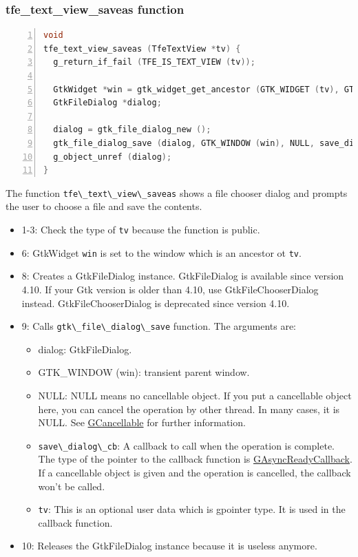 \subsubsection{tfe\_text\_view\_saveas
function}\label{tfe_text_view_saveas-function}

\begin{lstlisting}[language=C, numbers=left]
void
tfe_text_view_saveas (TfeTextView *tv) {
  g_return_if_fail (TFE_IS_TEXT_VIEW (tv));

  GtkWidget *win = gtk_widget_get_ancestor (GTK_WIDGET (tv), GTK_TYPE_WINDOW);
  GtkFileDialog *dialog;

  dialog = gtk_file_dialog_new ();
  gtk_file_dialog_save (dialog, GTK_WINDOW (win), NULL, save_dialog_cb, tv);
  g_object_unref (dialog);
}
\end{lstlisting}

The function \passthrough{\lstinline!tfe\_text\_view\_saveas!} shows a
file chooser dialog and prompts the user to choose a file and save the
contents.

\begin{itemize}
\tightlist
\item
  1-3: Check the type of \passthrough{\lstinline!tv!} because the
  function is public.
\item
  6: GtkWidget \passthrough{\lstinline!win!} is set to the window which
  is an ancestor ot \passthrough{\lstinline!tv!}.
\item
  8: Creates a GtkFileDialog instance. GtkFileDialog is available since
  version 4.10. If your Gtk version is older than 4.10, use
  GtkFileChooserDialog instead. GtkFileChooserDialog is deprecated since
  version 4.10.
\item
  9: Calls \passthrough{\lstinline!gtk\_file\_dialog\_save!} function.
  The arguments are:

  \begin{itemize}
  \tightlist
  \item
    dialog: GtkFileDialog.
  \item
    GTK\_WINDOW (win): transient parent window.
  \item
    NULL: NULL means no cancellable object. If you put a cancellable
    object here, you can cancel the operation by other thread. In many
    cases, it is NULL. See
    \href{https://docs.gtk.org/gio/class.Cancellable.html}{GCancellable}
    for further information.
  \item
    \passthrough{\lstinline!save\_dialog\_cb!}: A callback to call when
    the operation is complete. The type of the pointer to the callback
    function is
    \href{https://docs.gtk.org/gio/callback.AsyncReadyCallback.html}{GAsyncReadyCallback}.
    If a cancellable object is given and the operation is cancelled, the
    callback won't be called.
  \item
    \passthrough{\lstinline!tv!}: This is an optional user data which is
    gpointer type. It is used in the callback function.
  \end{itemize}
\item
  10: Releases the GtkFileDialog instance because it is useless anymore.
\end{itemize}


